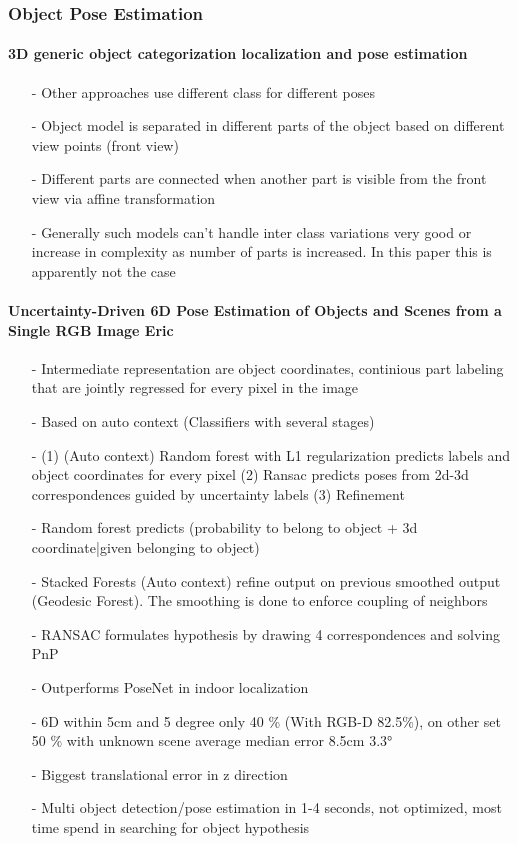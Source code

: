 	 	\subsubsection{Object Pose Estimation}
	 	\paragraph{3D generic object categorization localization and pose estimation \cite{Savarese}}
	 	\begin{itemize}
	 		\item[-] Other approaches use different class for different poses
	 		\item[-] Object model is separated in different parts of the object based on different view points (front view)
	 		\item[-] Different parts are connected when another part is visible from the front view via affine transformation
	 		\item[-] Generally such models can't handle inter class variations very good or increase in complexity as number of parts is increased. In this paper this is apparently not the case
	 	\end{itemize}
	 	\paragraph{Uncertainty-Driven 6D Pose Estimation of Objects and Scenes from a Single RGB Image
	 		Eric \cite{Brachmann}}
	 	\begin{itemize}
	 	\item[-] Intermediate representation are object coordinates, continious part labeling that are jointly regressed for every pixel in the image
	 	\item[-] Based on auto context (Classifiers with several stages)
	 	\item[-] (1) (Auto context) Random forest with L1 regularization predicts labels and object coordinates for every pixel (2) Ransac predicts poses from 2d-3d correspondences guided by uncertainty labels
	 	(3) Refinement
	 	\item[-] Random forest predicts (probability to belong to object + 3d coordinate|given belonging to object)
	 	\item[-] Stacked Forests (Auto context) refine output on previous smoothed output (Geodesic Forest). The smoothing is done to enforce coupling of neighbors 
	 	\item[-] RANSAC formulates hypothesis by drawing 4 correspondences and solving PnP
	 	\item[-] Outperforms PoseNet in indoor localization
	 	\item[-] 6D within 5cm and 5 degree only 40 \% (With RGB-D 82.5\%), on other set 50 \% with unknown scene average median error 8.5cm 3.3°
	 	\item[-] Biggest translational error in z direction
	 	\item[-] Multi object detection/pose estimation in 1-4 seconds, not optimized, most time spend in searching for object hypothesis
	 	\end{itemize}
